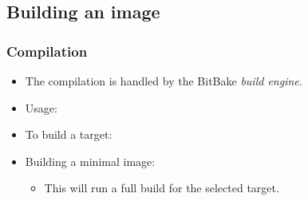 \subsection{Building an image}

\begin{frame}
  \frametitle{Compilation}
  \begin{itemize}
    \item The compilation is handled by the BitBake {\em build
      engine}.
    \item Usage: 
    \item To build a target: 
    \item Building a minimal image: 
    \begin{itemize}
      \item This will run a full build for the selected target.
    \end{itemize}
  \end{itemize}
\end{frame}
